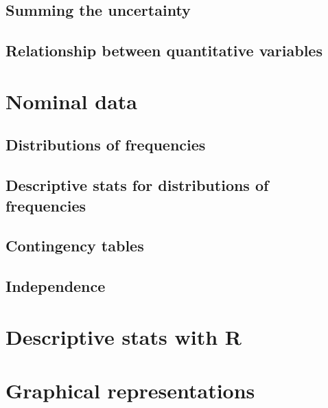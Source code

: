 \documentclass[a4paper,12pt,oneside]{book}
\begin{document}
\hypertarget{summing-the-uncertainty}{%
\subsection{Summing the uncertainty}\label{summing-the-uncertainty}}

\hypertarget{relationship-between-quantitative-variables}{%
\subsection{Relationship between quantitative variables}\label{relationship-between-quantitative-variables}}

\hypertarget{nominal-data}{%
\section{Nominal data}\label{nominal-data}}

\hypertarget{distributions-of-frequencies}{%
\subsection{Distributions of frequencies}\label{distributions-of-frequencies}}

\hypertarget{descriptive-stats-for-distributions-of-frequencies}{%
\subsection{Descriptive stats for distributions of frequencies}\label{descriptive-stats-for-distributions-of-frequencies}}

\hypertarget{contingency-tables}{%
\subsection{Contingency tables}\label{contingency-tables}}

\hypertarget{independence}{%
\subsection{Independence}\label{independence}}

\hypertarget{descriptive-stats-with-r}{%
\section{Descriptive stats with R}\label{descriptive-stats-with-r}}

\hypertarget{graphical-representations}{%
\section{Graphical representations}\label{graphical-representations}}
\end{document}
